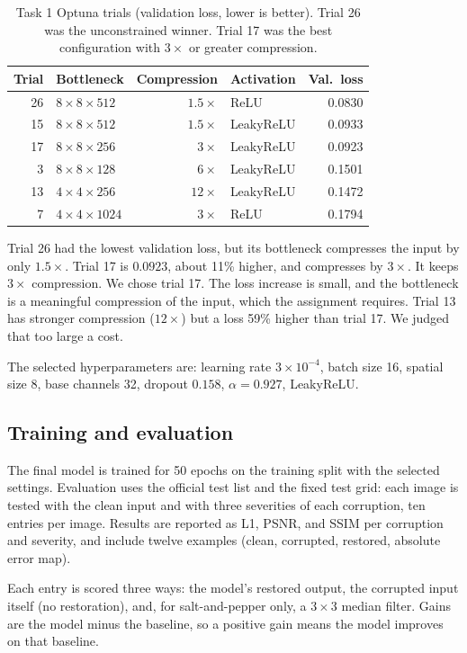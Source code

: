 \documentclass[conference]{IEEEtran}
\begin{document}
\begin{table}[t]
\centering
\caption{Task 1 Optuna trials (validation loss, lower is better). Trial 26 was the unconstrained
winner. Trial 17 was the best configuration with $3\times$ or greater compression.}
\label{tab:t1optuna}
\begin{tabular}{@{}rlrlr@{}}
\toprule
Trial & Bottleneck & Compression & Activation & Val.\ loss \\
\midrule
26 & $8\times8\times512$ & $1.5\times$ & ReLU & 0.0830 \\
15 & $8\times8\times512$ & $1.5\times$ & LeakyReLU & 0.0933 \\
17 & $8\times8\times256$ & $3\times$ & LeakyReLU & 0.0923 \\
3 & $8\times8\times128$ & $6\times$ & LeakyReLU & 0.1501 \\
13 & $4\times4\times256$ & $12\times$ & LeakyReLU & 0.1472 \\
7 & $4\times4\times1024$ & $3\times$ & ReLU & 0.1794 \\
\bottomrule
\end{tabular}
\end{table}

Trial 26 had the lowest validation loss, but its bottleneck compresses the input by only $1.5\times$.
Trial 17 is $0.0923$, about 11\% higher, and compresses by $3\times$. It keeps
$3\times$ compression. We chose trial 17. The loss increase is small, and the bottleneck is a
meaningful compression of the input, which the assignment requires. Trial 13 has stronger
compression ($12\times$) but a loss 59\% higher than trial 17. We judged that too large a cost.

The selected hyperparameters are: learning rate $3\times10^{-4}$, batch size 16, spatial size 8,
base channels 32, dropout $0.158$, $\alpha=0.927$, LeakyReLU.

\subsection{Training and evaluation}
The final model is trained for 50 epochs on the training split with the selected settings. Evaluation
uses the official test list and the fixed test grid: each image is tested with the clean input and
with three severities of each corruption, ten entries per image. Results are reported as L1, PSNR,
and SSIM per corruption and severity, and include twelve examples (clean, corrupted, restored,
absolute error map).

Each entry is scored three ways: the model's restored output, the corrupted input itself (no restoration),
and, for salt-and-pepper only, a $3\times3$ median filter. Gains are the model minus the baseline, so a
positive gain means the model improves on that baseline.
\end{document}
